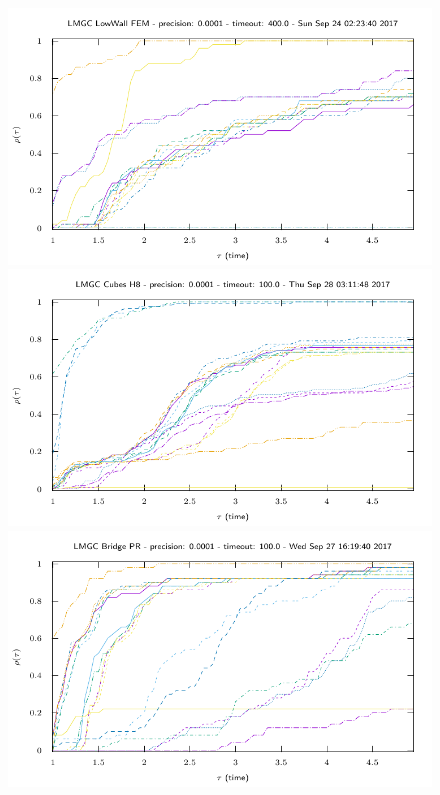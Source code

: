 \def\widthfigure{0.6}
\begin{figure}
  \centering
  \vspace{-1cm}
  \includegraphics[width=\figwidth]{../figure/NSGS/LocalSolver/1.0e-04/400/time/profile-LMGC_LowWall_FEM.pdf} 
  \includegraphics[width=\figwidth]{../figure/NSGS/LocalSolver/1.0e-04/100/time/profile-LMGC_Cubes_H8.pdf} 
  \includegraphics[width=\figwidth]{../figure/NSGS/LocalSolver/1.0e-04/100/time/profile-LMGC_Bridge_PR.pdf} 

\end{figure}
